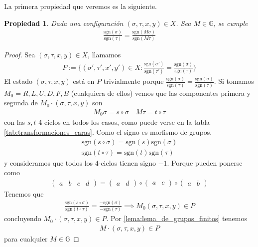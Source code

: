 \documentclass{article}
\newtheorem{propiedad}{Propiedad}[section]
\theoremstyle{definition}
\newcommand{\G}{\mathbb{G}}
\newcommand{\sgn}[1]{\text{sgn}\left(#1\right)}
\begin{document}
\bigskip
La primera propiedad que veremos es la siguiente.
\begin{propiedad}
    Dada una configuración $(\sigma,\tau,x,y)\in X$. Sea $M\in \G$, se cumple
    \begin{align*}
        \frac{\sgn{\sigma}}{\sgn{\tau}}=\frac{\sgn{M\sigma}}{\sgn{M\tau}}
    \end{align*}
\end{propiedad}
\begin{proof}
    Sea $(\sigma,\tau,x,y)\in X$, llamamos
    \begin{align*}
        P:=\{(\sigma',\tau',x',y')\in X: \frac{\sgn{\sigma'}}{\sgn{\tau'}}=\frac{\sgn{\sigma}}{\sgn{\tau}}\}
    \end{align*}
    El estado $(\sigma,\tau,x,y)$ está en $P$ trivialmente porque $\frac{\sgn{\sigma}}{\sgn{\tau}}=\frac{\sgn{\sigma}}{\sgn{\tau}}$. Si tomamos $M_0=R,L,U,D,F,B$ (cualquiera de ellos) vemos que las componentes primera y segunda de $M_0\cdot (\sigma,\tau,x,y)$ son
    \begin{align*}
        M_0\sigma=s\circ \sigma\quad M\tau=t\circ \tau
    \end{align*}
    con las $s,t$ 4-ciclos en todos los casos, como puede verse en la tabla \ref{tab:transformaciones_caras}. Como el signo es morfismo de grupos.
    \begin{align*}
        \sgn{s\circ \sigma}=\sgn{s}\sgn{\sigma} \\
        \sgn{t\circ \tau}=\sgn{t}\sgn{\tau}
    \end{align*}
    y consideramos que todos los 4-ciclos tienen signo $-1$. Porque pueden ponerse como
    \begin{align*}
        \begin{pmatrix}
            a & b & c & d
        \end{pmatrix}=\begin{pmatrix}
                          a & d
                      \end{pmatrix}\circ\begin{pmatrix}
                                            a & c
                                        \end{pmatrix}\circ\begin{pmatrix}
                                                              a & b
                                                          \end{pmatrix}
    \end{align*}
    Tenemos que
    \begin{align*}
        \frac{\sgn{s\circ\sigma}}{\sgn{t\circ\tau}}=\frac{-\sgn{\sigma}}{-\sgn{\tau}}\implies M_0(\sigma,\tau,x,y)\in P
    \end{align*}
    concluyendo $M_0\cdot (\sigma,\tau,x,y)\in P$. Por \ref{lema:lema_de_grupos_finitos} tenemos
    \begin{align*}
        M\cdot (\sigma,\tau,x,y)\in P
    \end{align*}
    para cualquier $M\in \G$
\end{proof}
\end{document}
